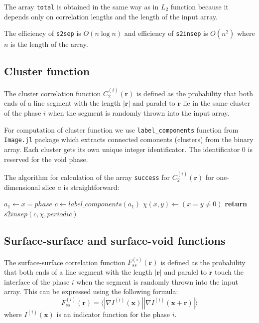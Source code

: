 \documentclass[reprint,amsmath,amssymb,aps,pre,showkeys,showpacs,nofootinbib]{revtex4-1}
\newcommand{\code}[1]{\colorbox{light-gray}{\texttt{#1}}}
\begin{document}
The array \code{total} is obtained in the same way as in $L_2$ function because
it depends only on correlation lengths and the length of the input array.

The efficiency of \code{s2sep} is $O(n\log n)$ and efficiency of
\code{s2insep} is $O(n^2)$ where $n$ is the length of the array.

\subsection{Cluster function}
The cluster correlation function $C_2^{(i)}(\bm{r})$ is defined as the
probability that both ends of a line segment with the length $|\bm{r}|$ and
paralel to $\bm{r}$ lie in the same cluster of the phase $i$ when the segment is
randomly thrown into the input array.

For computation of cluster function we use \code{label\_components} function
from \code{Image.jl} package which extracts connected comonents (clusters) from the
binary array. Each cluster gets its own unique integer identificator. The
identificator $0$ is reserved for the void phase.

The algorithm for calculation of the array \code{success} for
$C_2^{(i)}(\bm{r})$ for one-dimensional slice $a$ is straightforward:
\begin{algorithmic}[1]
  \State $a_1 \gets x = phase$ 
  \State $c \gets label\_components(a_1)$
  \State $\chi(x,y) \gets (x = y \ne 0)$
  \State \textbf{return} $s2insep(c, \chi, periodic)$
  \EndProcedure
\end{algorithmic}

\subsection{Surface-surface and surface-void functions}
The surface-surface correlation function $F_{ss}^{(i)}(\bm{r})$ is defined as
the probability that both ends of a line segment with the length $|\bm{r}|$ and
paralel to $\bm{r}$ touch the interface of the phase $i$ when the segment is
randomly thrown into the input array. This can be expressed using the following
formula:
\begin{equation*}
  F_{ss}^{(i)}(\bm{r}) = \langle |\nabla I^{(i)}(\bm{x})| |\nabla I^{(i)}(\bm{x}
  + \bm{r})| \rangle
\end{equation*}
where $I^{(i)}(\bm{x})$ is an indicator function for the phase $i$.
\end{document}
